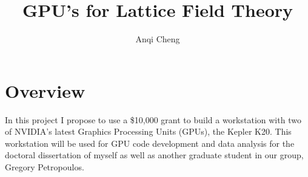 \documentclass[11pt]{article}
\begin{document}
  \title{GPU's for Lattice Field Theory}
  \author{Anqi Cheng}
  \maketitle

  \section*{Overview} %
  In this project  I propose to use a \$10,000 grant to build a workstation with two of NVIDIA's latest  Graphics Processing Units (GPUs), the Kepler K20.
  This workstation will be used for GPU code development and data analysis for the doctoral dissertation of myself as well as another graduate student in our group, Gregory Petropoulos.\\
  
\end{document}
